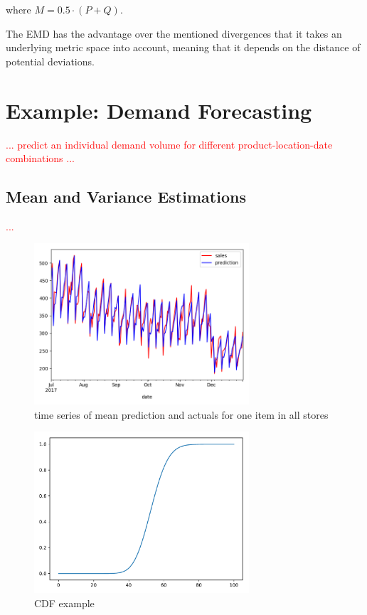 \documentclass[BCOR=1mm, DIV=calc,10pt,
twoside=true,
twocolumn,
headings=normal]{scrartcl}
\begin{document}
where $M = 0.5  \cdot (P + Q)$.

The EMD has the advantage over the mentioned divergences that it takes an underlying metric space into account, meaning that it depends on the distance of potential deviations.


\section{Example: Demand Forecasting}
\label{sec:example}

\textcolor{red}{... predict an individual demand volume for different product-location-date combinations ...}

\subsection{Mean and Variance Estimations}

\textcolor{red}{...}

\begin{figure}
\begin{center}
\includegraphics[width=8cm]{../figures/mean_prediction}
\caption{\label{fig:mean_prediction} time series of mean prediction and actuals for one item in all stores}
\end{center}
\end{figure}

\begin{figure}
\begin{center}
\includegraphics[width=8cm]{../figures/cdf}
\caption{\label{fig:cdf_example} CDF example}
\end{center}
\end{figure}
\end{document}
